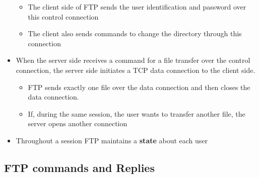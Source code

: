 \documentclass[11pt]{article}
\providecommand{\tightlist}{%
      \setlength{\itemsep}{0pt}\setlength{\parskip}{0pt}}
\begin{document}
\begin{itemize}
  \begin{itemize}
  \tightlist
  \item
    The client side of FTP sends the user identification and password
    over this control connection
  \item
    The client also sends commands to change the directory through this
    connection
  \end{itemize}
\item
  When the server side receives a command for a file transfer over the
  control connection, the server side initiates a TCP data connection to
  the client side.

  \begin{itemize}
  \tightlist
  \item
    FTP sends exactly one file over the data connection and then closes
    the data connection.
  \item
    If, during the same session, the user wants to transfer another
    file, the server opens another connection
  \end{itemize}
\item
  Throughout a session FTP maintains a \textbf{state} about each user
\end{itemize}

    \subsection{FTP commands and Replies}\label{ftp-commands-and-replies}
\end{document}
